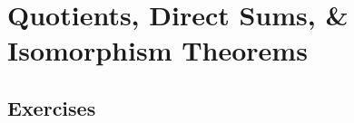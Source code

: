 \section{Quotients, Direct Sums, \& Isomorphism Theorems}


\newpage
\subsection*{Exercises}

\newpage

\newpage
